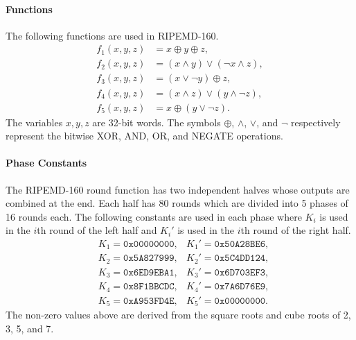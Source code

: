 \documentclass[10pt]{article}
\begin{document}
\paragraph{Functions}
The following functions are used in RIPEMD-160.
\begin{align*}
  f_1(x,y,z) & = x \oplus y \oplus z, \\
  f_2(x,y,z) & = \left( x \wedge y \right) \vee \left( \lnot x \wedge z \right), \\
  f_3(x,y,z) & = \left( x \vee \lnot y \right) \oplus z, \\
  f_4(x,y,z) & = \left( x \wedge z \right) \vee \left(  y \wedge \lnot z \right), \\
  f_5(x,y,z) & = x \oplus \left( y \vee \lnot z \right) .
\end{align*}
The variables $x, y, z$ are 32-bit words. The symbols $\oplus$, $\wedge$, $\vee$, and $\lnot$ respectively represent the bitwise XOR, AND, OR, and NEGATE operations.

\paragraph{Phase Constants}
The RIPEMD-160 round function has two independent halves whose outputs are combined at the end. Each half has 80 rounds which are divided into 5 phases of 16 rounds each. The following constants are used in each phase where $K_i$ is used in the $i$th round of the left half and $K_i'$ is used in the $i$th round of the right half.
\begin{align*}
  & K_1 = \texttt{0x00000000}, & K_1' = \texttt{0x50A28BE6},\\
  & K_2 = \texttt{0x5A827999}, & K_2' = \texttt{0x5C4DD124},\\
  & K_3 = \texttt{0x6ED9EBA1}, & K_3' = \texttt{0x6D703EF3},\\
  & K_4 = \texttt{0x8F1BBCDC}, & K_4' = \texttt{0x7A6D76E9},\\
  & K_5 = \texttt{0xA953FD4E}, & K_5' = \texttt{0x00000000}.
\end{align*}
The non-zero values above are derived from the square roots and cube roots of 2, 3, 5, and 7.
\end{document}

